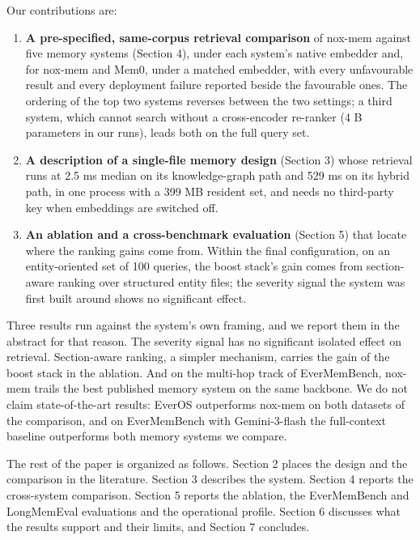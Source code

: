 \documentclass[a4paper,fleqn]{cas-sc}
\providecommand{\tightlist}{\setlength{\itemsep}{0pt}\setlength{\parskip}{0pt}}
\begin{document}
Our contributions are:

\begin{enumerate}
\def\labelenumi{\arabic{enumi}.}
\tightlist
\item
  \textbf{A pre-specified, same-corpus retrieval comparison} of nox-mem against five memory systems (Section 4), under each system's native embedder and, for nox-mem and Mem0, under a matched embedder, with every unfavourable result and every deployment failure reported beside the favourable ones. The ordering of the top two systems reverses between the two settings; a third system, which cannot search without a cross-encoder re-ranker (4 B parameters in our runs), leads both on the full query set.
\item
  \textbf{A description of a single-file memory design} (Section 3) whose retrieval runs at 2.5 ms median on its knowledge-graph path and 529 ms on its hybrid path, in one process with a 399 MB resident set, and needs no third-party key when embeddings are switched off.
\item
  \textbf{An ablation and a cross-benchmark evaluation} (Section 5) that locate where the ranking gains come from. Within the final configuration, on an entity-oriented set of 100 queries, the boost stack's gain comes from section-aware ranking over structured entity files; the severity signal the system was first built around shows no significant effect.
\end{enumerate}

Three results run against the system's own framing, and we report them in the abstract for that reason. The severity signal has no significant isolated effect on retrieval. Section-aware ranking, a simpler mechanism, carries the gain of the boost stack in the ablation. And on the multi-hop track of EverMemBench, nox-mem trails the best published memory system on the same backbone. We do not claim state-of-the-art results: EverOS outperforms nox-mem on both datasets of the comparison, and on EverMemBench with Gemini-3-flash the full-context baseline outperforms both memory systems we compare.

The rest of the paper is organized as follows. Section 2 places the design and the comparison in the literature. Section 3 describes the system. Section 4 reports the cross-system comparison. Section 5 reports the ablation, the EverMemBench and LongMemEval evaluations and the operational profile. Section 6 discusses what the results support and their limits, and Section 7 concludes.
\end{document}
